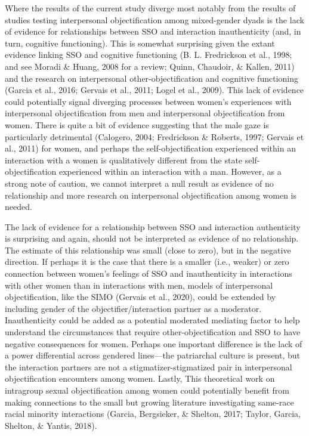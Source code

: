 \documentclass[man]{apa6}
\begin{document}
Where the results of the current study diverge most notably from the
results of studies testing interpersonal objectification among
mixed-gender dyads is the lack of evidence for relationships between SSO
and interaction inauthenticity (and, in turn, cognitive functioning).
This is somewhat surprising given the extant evidence linking SSO and
cognitive functioning (B. L. Fredrickson et al., 1998; and see Moradi \&
Huang, 2008 for a review; Quinn, Chaudoir, \& Kallen, 2011) and the
research on interpersonal other-objectification and cognitive
functioning (Garcia et al., 2016; Gervais et al., 2011; Logel et al.,
2009). This lack of evidence could potentially signal diverging
processes between women's experiences with interpersonal objectification
from men and interpersonal objectification from women. There is quite a
bit of evidence suggesting that the male gaze is particularly
detrimental (Calogero, 2004; Fredrickson \& Roberts, 1997; Gervais et
al., 2011) for women, and perhaps the self-objectification experienced
within an interaction with a women is qualitatively different from the
state self-objectification experienced within an interaction with a man.
However, as a strong note of caution, we cannot interpret a null result
as evidence of no relationship and more research on interpersonal
objectification among women is needed.

The lack of evidence for a relationship between SSO and interaction
authenticity is surprising and again, should not be interpreted as
evidence of no relationship. The estimate of this relationship was small
(close to zero), but in the negative direction. If perhaps it is the
case that there is a smaller (i.e., weaker) or zero connection between
women's feelings of SSO and inauthenticity in interactions with other
women than in interactions with men, models of interpersonal
objectification, like the SIMO (Gervais et al., 2020), could be extended
by including gender of the objectifier/interaction partner as a
moderator. Inauthenticity could be added as a potential moderated
mediating factor to help understand the circumstances that require
other-objectification and SSO to have negative consequences for women.
Perhaps one important difference is the lack of a power differential
across gendered lines---the patriarchal culture is present, but the
interaction partners are not a stigmatizer-stigmatized pair in
interpersonal objectification encounters among women. Lastly, This
theoretical work on intragroup sexual objectification among women could
potentially benefit from making connections to the small but growing
literature investigating same-race racial minority interactions (Garcia,
Bergsieker, \& Shelton, 2017; Taylor, Garcia, Shelton, \& Yantis, 2018).
\end{document}

